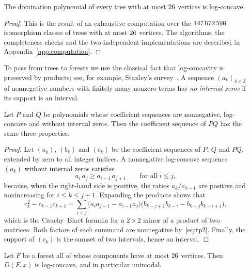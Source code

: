 \begin{theorem}\label{thm:small}
The domination polynomial of every tree with at most $26$ vertices is
log-concave.
\end{theorem}

\begin{proof}
This is the result of an exhaustive computation over the $447\,672\,596$
isomorphism classes of trees with at most $26$ vertices. The algorithms,
the completeness checks and the two independent implementations are described
in Appendix~\ref{app:computation}.
\end{proof}

To pass from trees to forests we use the classical fact that log-concavity is
preserved by products; see, for example, Stanley's survey~\cite{Stanley}. A
sequence $(a_k)_{k\in\mathbb Z}$ of nonnegative numbers with finitely many
nonzero terms has \emph{no internal zeros} if its support is an interval.

\begin{lemma}\label{lem:product}
Let $P$ and $Q$ be polynomials whose coefficient sequences are nonnegative,
log-concave and without internal zeros. Then the coefficient sequence of
$PQ$ has the same three properties.
\end{lemma}

\begin{proof}
Let $(a_k)$, $(b_k)$ and $(c_k)$ be the coefficient sequences of $P$, $Q$ and
$PQ$, extended by zero to all integer indices. A nonnegative log-concave
sequence $(a_k)$ without internal zeros satisfies
\begin{equation}\label{eq:tp2}
  a_i\,a_j\ge a_{i-1}\,a_{j+1}\qquad\text{for all } i\le j ,
\end{equation}
because, when the right-hand side is positive, the ratios $a_k/a_{k-1}$ are
positive and nonincreasing for $i\le k\le j+1$. Expanding the products shows
that
\[
  c_k^2-c_{k-1}c_{k+1}=\sum_{i<j}
  \bigl(a_i a_{j-1}-a_{i-1}a_j\bigr)\bigl(b_{k-j+1}b_{k-i}-b_{k-j}b_{k-i+1}\bigr),
\]
which is the Cauchy--Binet formula for a $2\times2$ minor of a product of two
matrices. Both factors of each summand are nonnegative by~\eqref{eq:tp2}.
Finally, the support of $(c_k)$ is the sumset of two intervals, hence an
interval.
\end{proof}

\begin{corollary}\label{cor:smallforest}
Let $F$ be a forest all of whose components have at most $26$ vertices.
Then $D(F,x)$ is log-concave, and in particular unimodal.
\end{corollary}

